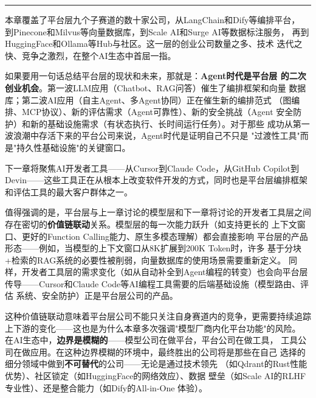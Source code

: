 \bigskip

\noindent\rule{\textwidth}{0.4pt}

\bigskip

本章覆盖了平台层九个子赛道的数十家公司，从LangChain和Dify等编排平台，
到Pinecone和Milvus等向量数据库，到Scale AI和Surge AI等数据标注服务，
再到HuggingFace和Ollama等Hub与社区。这一层的创业公司数量之多、技术
迭代之快、竞争之激烈，在整个AI生态中首屈一指。

如果要用一句话总结平台层的现状和未来，那就是：\textbf{Agent时代是平台层
的二次创业机会}。第一波LLM应用（Chatbot、RAG问答）催生了编排框架和向量
数据库；第二波AI应用（自主Agent、多Agent协同）正在催生新的编排范式
（图编排、MCP协议）、新的评估需求（Agent可靠性）、新的安全挑战（Agent
安全防护）和新的基础设施需求（有状态执行、长时间运行任务）。对于那些
成功从第一波浪潮中存活下来的平台公司来说，Agent时代是证明自己不只是
"过渡性工具"而是"持久性基础设施"的关键窗口。

下一章将聚焦AI开发者工具——从Cursor到Claude Code，从GitHub Copilot到
Devin——这些工具正在从根本上改变软件开发的方式，同时也是平台层编排框架
和评估工具的最大客户群体之一。

值得强调的是，平台层与上一章讨论的模型层和下一章将讨论的开发者工具层之间
存在密切的\textbf{价值链联动}关系。模型层的每一次能力跃升（如支持更长的
上下文窗口、更好的Function Calling能力、原生多模态理解）都会直接影响
平台层的产品形态——例如，当模型的上下文窗口从8K扩展到200K Token时，许多
基于分块+检索的RAG系统的必要性被削弱，向量数据库的使用场景需要重新定义。
同样，开发者工具层的需求变化（如从自动补全到Agent编程的转变）也会向平台层
传导——Cursor和Claude Code等AI编程工具需要的后端基础设施（模型路由、评估
系统、安全防护）正是平台层公司的产品。

这种价值链联动意味着平台层公司不能只关注自身赛道内的竞争，更需要持续追踪
上下游的变化——这也是为什么本章多次强调"模型厂商内化平台功能"的风险。
在AI生态中，\textbf{边界是模糊的}——模型公司在做平台，平台公司在做工具，
工具公司在做应用。在这种边界模糊的环境中，最终胜出的公司将是那些在自己
选择的细分领域中做到\textbf{不可替代}的公司——无论是通过技术领先
（如Qdrant的Rust性能优势）、社区锁定（如HuggingFace的网络效应）、数据
壁垒（如Scale AI的RLHF专业性）、还是整合能力（如Dify的All-in-One
体验）。

